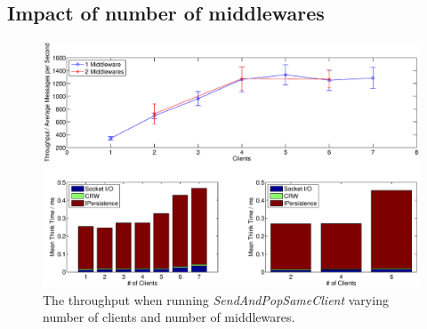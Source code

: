 \documentclass{article}
\begin{document}
        \subsection{Impact of number of middlewares}
            \begin{figure}[H]
                \hspace{-1.5cm}
                \includegraphics[scale=0.40]{throughout-thinktime_middleware_clients}
                \caption{The throughput when running \textit{SendAndPopSameClient} varying number of clients and number of middlewares.}
                \label{fig:throughput_middleware_clients}
                \end{figure}
\end{document}
